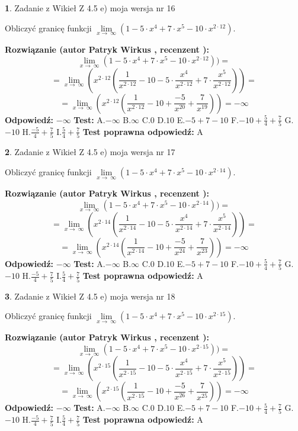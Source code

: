 \documentclass[12pt, a4paper]{article}
\theoremstyle{definition} %
\newtheorem{zad}{}
\newcommand{\zadStart}[1]{\begin{zad}#1\newline}
\newcommand{\zadStop}{\end{zad}}
\newcommand{\rozwStart}[2]{\noindent \textbf{Rozwiązanie (autor #1 , recenzent #2): }\newline}
\newcommand{\rozwStop}{\newline}
\newcommand{\odpStart}{\noindent \textbf{Odpowiedź:}\newline}
\newcommand{\odpStop}{\newline}
\newcommand{\testStart}{\noindent \textbf{Test:}\newline}
\newcommand{\testStop}{\newline}
\newcommand{\kluczStart}{\noindent \textbf{Test poprawna odpowiedź:}\newline}
\newcommand{\kluczStop}{\newline}
\begin{document}
\zadStart{Zadanie z Wikieł Z 4.5 e) moja wersja nr 16}



Obliczyć granicę funkcji  $\lim\limits_{x\to\ \infty}(1 - 5 \cdot x^{4}+7 \cdot x^{5}- 10 \cdot x^{2\cdot12})$.
\zadStop
\rozwStart{Patryk Wirkus}{}
$$\lim\limits_{x\to\ \infty}(1 - 5 \cdot x^{4}+7 \cdot x^{5}- 10 \cdot x^{2\cdot12}))=$$
$$=\lim\limits_{x\to\ \infty}(x^{2\cdot12}(\frac{1}{x^{2\cdot12}}-10 -5 \cdot \frac{x^{4}}{x^{2\cdot12}}+7 \cdot \frac{x^{5}}{x^{2\cdot12}}))=$$
$$=\lim\limits_{x\to\ \infty}(x^{2\cdot12}(\frac{1}{x^{2\cdot12}}-10 + \frac{-5}{x^{20}}+ \frac{7}{x^{19}}))=-\infty$$
\rozwStop
\odpStart
$-\infty$
\odpStop
\testStart
A.$-\infty$ B.$\infty$ C.$0$ D.$10$ E.$-5 + 7 - 10$
F.$-10+\frac{5}{4}+\frac{7}{5}$ G.$-10$
H.$\frac{-5}{4}+\frac{7}{5}$
I.$\frac{5}{4}+\frac{7}{5}$
\testStop
\kluczStart
A
\kluczStop



\zadStart{Zadanie z Wikieł Z 4.5 e) moja wersja nr 17}



Obliczyć granicę funkcji  $\lim\limits_{x\to\ \infty}(1 - 5 \cdot x^{4}+7 \cdot x^{5}- 10 \cdot x^{2\cdot14})$.
\zadStop
\rozwStart{Patryk Wirkus}{}
$$\lim\limits_{x\to\ \infty}(1 - 5 \cdot x^{4}+7 \cdot x^{5}- 10 \cdot x^{2\cdot14}))=$$
$$=\lim\limits_{x\to\ \infty}(x^{2\cdot14}(\frac{1}{x^{2\cdot14}}-10 -5 \cdot \frac{x^{4}}{x^{2\cdot14}}+7 \cdot \frac{x^{5}}{x^{2\cdot14}}))=$$
$$=\lim\limits_{x\to\ \infty}(x^{2\cdot14}(\frac{1}{x^{2\cdot14}}-10 + \frac{-5}{x^{24}}+ \frac{7}{x^{23}}))=-\infty$$
\rozwStop
\odpStart
$-\infty$
\odpStop
\testStart
A.$-\infty$ B.$\infty$ C.$0$ D.$10$ E.$-5 + 7 - 10$
F.$-10+\frac{5}{4}+\frac{7}{5}$ G.$-10$
H.$\frac{-5}{4}+\frac{7}{5}$
I.$\frac{5}{4}+\frac{7}{5}$
\testStop
\kluczStart
A
\kluczStop



\zadStart{Zadanie z Wikieł Z 4.5 e) moja wersja nr 18}



Obliczyć granicę funkcji  $\lim\limits_{x\to\ \infty}(1 - 5 \cdot x^{4}+7 \cdot x^{5}- 10 \cdot x^{2\cdot15})$.
\zadStop
\rozwStart{Patryk Wirkus}{}
$$\lim\limits_{x\to\ \infty}(1 - 5 \cdot x^{4}+7 \cdot x^{5}- 10 \cdot x^{2\cdot15}))=$$
$$=\lim\limits_{x\to\ \infty}(x^{2\cdot15}(\frac{1}{x^{2\cdot15}}-10 -5 \cdot \frac{x^{4}}{x^{2\cdot15}}+7 \cdot \frac{x^{5}}{x^{2\cdot15}}))=$$
$$=\lim\limits_{x\to\ \infty}(x^{2\cdot15}(\frac{1}{x^{2\cdot15}}-10 + \frac{-5}{x^{26}}+ \frac{7}{x^{25}}))=-\infty$$
\rozwStop
\odpStart
$-\infty$
\odpStop
\testStart
A.$-\infty$ B.$\infty$ C.$0$ D.$10$ E.$-5 + 7 - 10$
F.$-10+\frac{5}{4}+\frac{7}{5}$ G.$-10$
H.$\frac{-5}{4}+\frac{7}{5}$
I.$\frac{5}{4}+\frac{7}{5}$
\testStop
\kluczStart
A
\kluczStop
\end{document}
